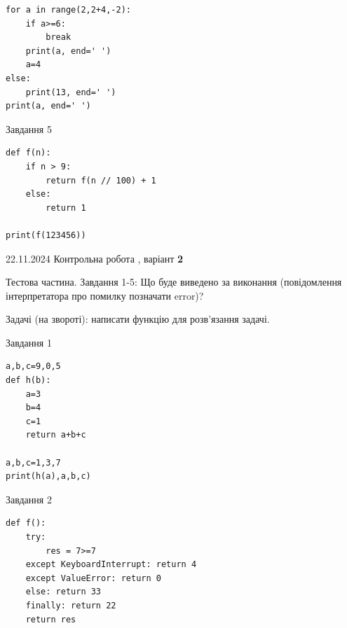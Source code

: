 \documentclass[12pt, ukrainian]{article}
\begin{document}
{\begin{minipage}[t]{10.7cm}
\begin{verbatim}
for a in range(2,2+4,-2):
    if a>=6:
        break
    print(a, end=' ')
    a=4
else:
    print(13, end=' ')
print(a, end=' ')
\end{verbatim}


\vspace{5mm}
               
{\begin{center}Завдання {5}\end{center}}
\vspace{-6mm}

\begin{verbatim}
def f(n):
    if n > 9:
        return f(n // 100) + 1
    else:
        return 1

print(f(123456))
\end{verbatim}


\end{minipage}

\newpage

{{22.11.2024 Контрольна робота , варіант  \No \textbf { 2 }\par}}
{

Тестова частина. Завдання 1-5: Що буде виведено за виконання (повідомлення інтерпретатора про помилку позначати error)?

Задачі (на звороті): написати функцію для розв'язання задачі.

\vspace{5mm} \begin{minipage}[t]{8.5cm}
               
{\begin{center}Завдання {1}\end{center}}
\vspace{-6mm}

\begin{verbatim}
a,b,c=9,0,5
def h(b):
    a=3
    b=4
    c=1
    return a+b+c

a,b,c=1,3,7
print(h(a),a,b,c)
\end{verbatim}


\vspace{5mm}
               
{\begin{center}Завдання {2}\end{center}}
\vspace{-6mm}

\begin{verbatim}
def f():
    try:
        res = 7>=7
    except KeyboardInterrupt: return 4
    except ValueError: return 0
    else: return 33
    finally: return 22
    return res


\end{verbatim}
\end{minipage}}}
\end{document}
